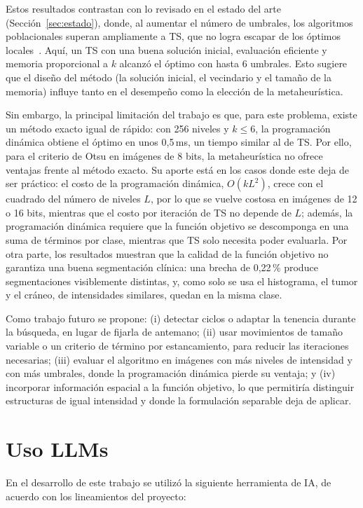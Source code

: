 \documentclass[letter, 10pt]{article}
\begin{document}
Estos resultados contrastan con lo revisado en el estado del arte (Sección~\ref{sec:estado}), donde, al aumentar el número de umbrales, los algoritmos poblacionales superan ampliamente a TS, que no logra escapar de los óptimos locales~\cite{Hammouche2010Comparative}. Aquí, un TS con una buena solución inicial, evaluación eficiente y memoria proporcional a $k$ alcanzó el óptimo con hasta 6 umbrales. Esto sugiere que el diseño del método (la solución inicial, el vecindario y el tamaño de la memoria) influye tanto en el desempeño como la elección de la metaheurística.

Sin embargo, la principal limitación del trabajo es que, para este problema, existe un método exacto igual de rápido: con 256 niveles y $k \leq 6$, la programación dinámica obtiene el óptimo en unos 0,5\,ms, un tiempo similar al de TS. Por ello, para el criterio de Otsu en imágenes de 8 bits, la metaheurística no ofrece ventajas frente al método exacto. Su aporte está en los casos donde este deja de ser práctico: el costo de la programación dinámica, $O(kL^2)$, crece con el cuadrado del número de niveles $L$, por lo que se vuelve costosa en imágenes de 12 o 16 bits, mientras que el costo por iteración de TS no depende de $L$; además, la programación dinámica requiere que la función objetivo se descomponga en una suma de términos por clase, mientras que TS solo necesita poder evaluarla. Por otra parte, los resultados muestran que la calidad de la función objetivo no garantiza una buena segmentación clínica: una brecha de 0,22\,\% produce segmentaciones visiblemente distintas, y, como solo se usa el histograma, el tumor y el cráneo, de intensidades similares, quedan en la misma clase.

Como trabajo futuro se propone: (i) detectar ciclos o adaptar la tenencia durante la búsqueda, en lugar de fijarla de antemano; (ii) usar movimientos de tamaño variable o un criterio de término por estancamiento, para reducir las iteraciones necesarias; (iii) evaluar el algoritmo en imágenes con más niveles de intensidad y con más umbrales, donde la programación dinámica pierde su ventaja; y (iv) incorporar información espacial a la función objetivo, lo que permitiría distinguir estructuras de igual intensidad y donde la formulación separable deja de aplicar.

\section{Uso LLMs}
\noindent En el desarrollo de este trabajo se utilizó la siguiente herramienta de IA, de acuerdo con los lineamientos del proyecto:
\end{document}

